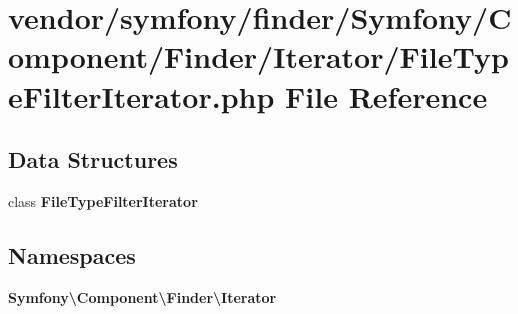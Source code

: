 \section{vendor/symfony/finder/\+Symfony/\+Component/\+Finder/\+Iterator/\+File\+Type\+Filter\+Iterator.php File Reference}
\label{_file_type_filter_iterator_8php}
\subsection*{Data Structures}
\begin{DoxyCompactItemize}
\item 
class {\bf File\+Type\+Filter\+Iterator}
\end{DoxyCompactItemize}
\subsection*{Namespaces}
\begin{DoxyCompactItemize}
\item 
 {\bf Symfony\textbackslash{}\+Component\textbackslash{}\+Finder\textbackslash{}\+Iterator}
\end{DoxyCompactItemize}
